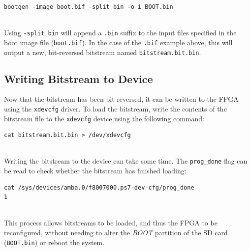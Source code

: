\begin{lstlisting}
bootgen -image boot.bif -split bin -o i BOOT.bin
\end{lstlisting}

~\\ Using \texttt{-split bin} will append a \texttt{.bin} suffix to the input files specified in the boot image file (\texttt{boot.bif}). In the case of the \texttt{.bif} example above, this will output a new, bit-reversed bitstream named \texttt{bitstream.bit.bin}.


\subsection{Writing Bitstream to Device}


Now that the bitstream has been bit-reversed, it can be written to the FPGA using the \texttt{xdevcfg} driver. To load the bitstream, write the contents of the bitstream file to the \texttt{xdevcfg} device using the following command: \\

\begin{lstlisting}[style=text]
cat bitstream.bit.bin > /dev/xdevcfg
\end{lstlisting}


~\\
\noindent
Writing the bitstream to the device can take some time. The \texttt{prog\_done} flag can be read to check whether the bitstream has finished loading: \\

\begin{lstlisting}[style=text]
cat /sys/devices/amba.0/f8007000.ps7-dev-cfg/prog_done
1
\end{lstlisting}


~\\
\noindent
This process allows bitstreams to be loaded, and thus the FPGA to be reconfigured, without needing to alter the \textit{BOOT} partition of the SD card (\ie \texttt{BOOT.bin}) or reboot the system. 



